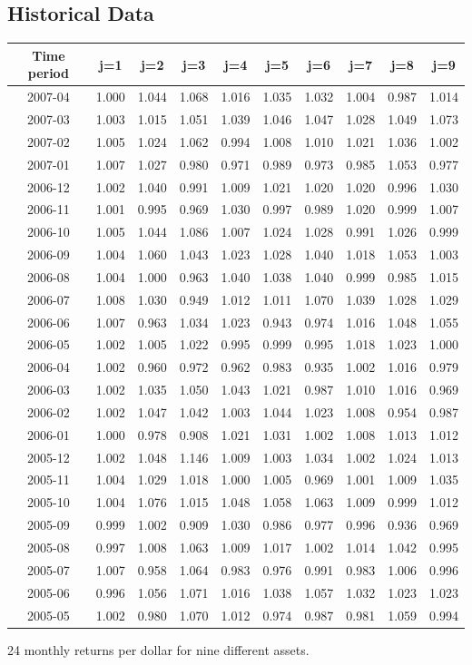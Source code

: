 \documentclass{article}
\begin{document}
\subsection{Historical Data}
\begin{center}
\begin{tabular}{ |c|c|c|c|c|c|c|c|c|c| } 
\hline
Time period & j=1 & j=2 & j=3 & j=4 & j=5 & j=6 & j=7 & j=8 & j=9 \\
\hline
2007-04 & 1.000 & 1.044 &1.068& 1.016& 1.035 &1.032 &1.004 &0.987 &1.014\\
2007-03 &1.003 &1.015& 1.051& 1.039& 1.046 &1.047 &1.028 &1.049 &1.073\\
2007-02 &1.005 &1.024 &1.062& 0.994 &1.008& 1.010 &1.021& 1.036 &1.002\\
2007-01& 1.007 &1.027 &0.980& 0.971 &0.989 &0.973& 0.985 &1.053 &0.977\\
2006-12 &1.002 &1.040 &0.991& 1.009 &1.021 &1.020 &1.020 &0.996 &1.030\\
2006-11 &1.001& 0.995 &0.969& 1.030 &0.997 &0.989 &1.020 &0.999& 1.007\\
2006-10 &1.005 &1.044 &1.086& 1.007 &1.024& 1.028 &0.991 &1.026& 0.999\\
2006-09 &1.004& 1.060 &1.043& 1.023 &1.028& 1.040 &1.018& 1.053& 1.003\\
2006-08 &1.004 &1.000 &0.963& 1.040& 1.038 &1.040 &0.999 &0.985& 1.015\\
2006-07 &1.008 &1.030 &0.949& 1.012 &1.011 &1.070 &1.039& 1.028& 1.029\\
2006-06 &1.007 &0.963 &1.034& 1.023 &0.943 &0.974 &1.016& 1.048& 1.055\\
2006-05 &1.002 &1.005 &1.022 &0.995 &0.999 &0.995 &1.018& 1.023& 1.000\\
2006-04 &1.002 &0.960 &0.972& 0.962 &0.983 &0.935 &1.002 &1.016& 0.979\\
2006-03 &1.002 &1.035 &1.050& 1.043 &1.021 &0.987 &1.010 &1.016 &0.969\\
2006-02 &1.002 &1.047& 1.042& 1.003 &1.044 &1.023 &1.008& 0.954& 0.987\\
2006-01& 1.000 &0.978& 0.908& 1.021 &1.031& 1.002 &1.008& 1.013& 1.012\\
2005-12 &1.002 &1.048& 1.146 &1.009 &1.003& 1.034 &1.002& 1.024& 1.013\\
2005-11 &1.004 &1.029 &1.018 &1.000 &1.005& 0.969 &1.001& 1.009& 1.035\\
2005-10 &1.004 &1.076 &1.015 &1.048 &1.058& 1.063& 1.009 &0.999& 1.012\\
2005-09 &0.999 &1.002 &0.909 &1.030& 0.986& 0.977& 0.996& 0.936& 0.969\\
2005-08 &0.997 &1.008 &1.063& 1.009 &1.017& 1.002 &1.014 &1.042 &0.995\\
2005-07 &1.007 &0.958 &1.064& 0.983 &0.976& 0.991& 0.983 &1.006 &0.996\\
2005-06 &0.996 &1.056 &1.071& 1.016 &1.038 &1.057& 1.032 &1.023 &1.023\\
2005-05 &1.002 &0.980 &1.070& 1.012 &0.974 &0.987& 0.981 &1.059 &0.994\\
\hline
\end{tabular}
\end{center}
\caption{24 monthly returns per dollar for nine different assets.}
\end{document}
